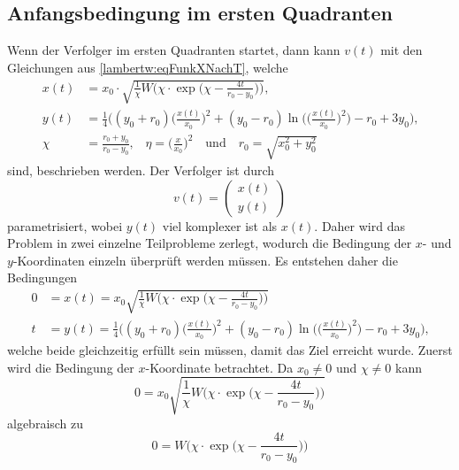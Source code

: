 \subsection{Anfangsbedingung im ersten Quadranten}
%
Wenn der Verfolger im ersten Quadranten startet, dann kann $v(t)$ mit den Gleichungen aus \eqref{lambertw:eqFunkXNachT}, welche
\begin{align}
    x\left(t\right)
    &=
    x_0\cdot\sqrt{\frac{1}{\chi}W\biggl(\chi\cdot \exp\biggl( \chi-\frac{4t}{r_0-y_0}\biggr) \biggr)} \text{,}\\
    y(t)
    &=
    \frac{1}{4}\biggl((y_0+r_0)\biggl(\frac{x(t)}{x_0}\biggr)^2+(y_0-r_0)\operatorname{ln}\biggl(\biggl(\frac{x(t)}{x_0}\biggr)^2\biggr)-r_0+3y_0\biggr) \text{,}\\
    \chi
    &=
    \frac{r_0+y_0}{r_0-y_0}\text{,} \quad
    \eta
    =
    \biggl(\frac{x}{x_0}\biggr)^2 \quad\text{und}\quad
    r_0
    =
    \sqrt{x_0^2+y_0^2}
\end{align}
%
sind,
beschrieben werden.
Der Verfolger ist durch
\begin{equation}
    v(t)
    =
    \begin{pmatrix} x(t) \\ y(t) \end{pmatrix}
\end{equation}
%
parametrisiert, wobei $y(t)$ viel komplexer ist als $x(t)$.
Daher wird das Problem in zwei einzelne Teilprobleme zerlegt, wodurch die Bedingung der $x$- und $y$-Koordinaten einzeln überprüft werden müssen. Es entstehen daher die Bedingungen
%
\begin{align}
    0
    &=
    x(t)
    =
    x_0\sqrt{\frac{1}{\chi}W\biggl(\chi\cdot \exp\biggl( \chi-\frac{4t}{r_0-y_0}\biggr)\biggr)}
    \\
    t
    &=
    y(t)
    =
    \frac{1}{4}\biggl((y_0+r_0)\biggl(\frac{x(t)}{x_0}\biggr)^2
	+
	(y_0-r_0)\operatorname{ln}\biggl(\biggl(\frac{x(t)}{x_0}\biggr)^2\biggr)-r_0+3y_0\biggr)
    \text{,}
\end{align}
%
welche beide gleichzeitig erfüllt sein müssen, damit das Ziel erreicht wurde.
Zuerst wird die Bedingung der $x$-Koordinate betrachtet.
Da $x_0 \neq 0$ und $\chi \neq 0$ kann
\begin{equation}
    0
    =
    x_0\sqrt{\frac{1}{\chi}W\biggl(\chi\cdot \exp\biggl( \chi-\frac{4t}{r_0-y_0}\biggr)\biggr)}
\end{equation}
algebraisch zu
\begin{equation}
    0
    =
    W\biggl(\chi\cdot \exp\biggl( \chi-\frac{4t}{r_0-y_0}\biggr)\biggr)
\end{equation}
